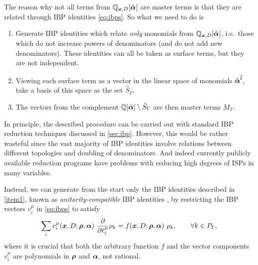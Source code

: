 The reason why not all terms from $\mathbb{Q}_{\vb*{x},D}[\hat{\vb*{\alpha}}]$ are master terms is that they are
related through IBP identities \eqref{eq:ibps}. So what we need to do is
\begin{enumerate}
  \item Generate IBP identities which relate
    \emph{only} monomials from $\mathbb{Q}_{\vb*{x},D}[\hat{\vb*{\alpha}}]$, i.e.\ those which do not increase powers of denominators (and do not add new denominators).
    These identities can all be taken as surface terms, but they are not independent. 
    \label{item1}
  \item  Viewing each surface term as a vector in the linear space of monomials $\hat{\vb*{\alpha}}^{\va{i}}$, take
    a basis of this space as the set $\hat{S}_\Gamma$.
    \label{item2}
  \item The vectors from the complement $\mathbb{Q}[\hat{\vb*{\alpha}}]\setminus \hat{S}_\Gamma$ are then master terms $M_\Gamma$.
    \label{item3}
\end{enumerate}

In principle, the described procedure can be carried out with standard IBP reduction techniques discussed in \cref{sec:ibp}.
However, this would be rather wasteful
since the vast majority of IBP identities involve relations between different topologies and doubling of denominators.
And indeed currently publicly available reduction programs
\cite{Studerus:2009ye,vonManteuffel:2012np, Smirnov:2008iw,Smirnov:2014hma, Lee:2012cn,Lee:2013mka, Maierhoefer:2017hyi,Maierhofer:2018gpa}
have problems with reducing high degrees of ISPs in many variables.

Instead, we can generate from the start only the IBP identities described in \cref{item1},
known as \emph{unitarity-compatible} IBP identities \cite{Gluza:2010ws,Schabinger:2011dz,Ita:2015tya}, by
restricting the IBP vectors $v_i^\mu$ in \cref{eq:ibps} to satisfy
\begin{equation} \label{eq:non_doubling_ibp_vectors}
  \sum_i v_i^\mu(\vb*{x},D;\vb*{\rho},\vb*{\alpha}) ~ \pdv{\ell^\mu_i} \rho_k = f(\vb*{x},D;\vb*{\rho},\vb*{\alpha}) ~ \rho_k, \qquad \forall k\in P_\Gamma,
\end{equation}
where it is crucial that both the arbitrary function $f$ and the vector components $v_i^\mu$ are polynomials in $\vb*{\rho}$ and $\vb*{\alpha}$, not rational.

